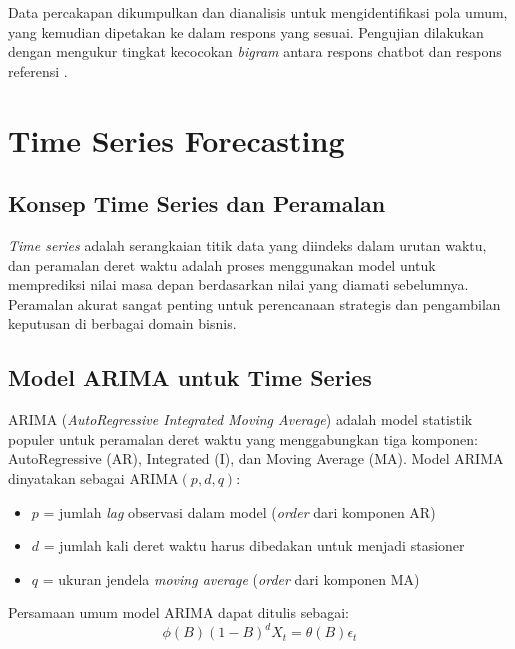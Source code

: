 Data percakapan dikumpulkan dan dianalisis untuk mengidentifikasi pola umum, yang kemudian dipetakan ke dalam respons yang sesuai. Pengujian dilakukan dengan mengukur tingkat kecocokan \textit{bigram} antara respons chatbot dan respons referensi \parencite{rahayu2024implementation}.

\section{Time Series Forecasting}

\subsection{Konsep Time Series dan Peramalan}

\textit{Time series} adalah serangkaian titik data yang diindeks dalam urutan waktu, dan peramalan deret waktu adalah proses menggunakan model untuk memprediksi nilai masa depan berdasarkan nilai yang diamati sebelumnya. Peramalan akurat sangat penting untuk perencanaan strategis dan pengambilan keputusan di berbagai domain bisnis.

\subsection{Model ARIMA untuk Time Series}

ARIMA (\textit{AutoRegressive Integrated Moving Average}) adalah model statistik populer untuk peramalan deret waktu yang menggabungkan tiga komponen: AutoRegressive (AR), Integrated (I), dan Moving Average (MA). Model ARIMA dinyatakan sebagai ARIMA$(p, d, q)$:
\begin{itemize}
\item $p$ = jumlah \textit{lag} observasi dalam model (\textit{order} dari komponen AR)
\item $d$ = jumlah kali deret waktu harus dibedakan untuk menjadi stasioner
\item $q$ = ukuran jendela \textit{moving average} (\textit{order} dari komponen MA)
\end{itemize}

Persamaan umum model ARIMA dapat ditulis sebagai:
\begin{equation}
\phi(B)(1-B)^d X_t = \theta(B) \epsilon_t
\end{equation}

